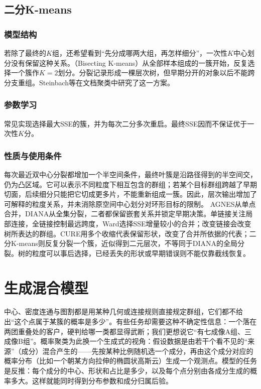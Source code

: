 \subsection{二分K-means}

\subsubsection{模型结构}

若除了最终的$K$组，还希望看到“先分成哪两大组，再怎样细分”，一次性$K$中心划分没有保留这种关系。（Bisecting K-means）从全部样本组成的一簇开始，反复选择一个簇作$K=2$划分。分裂记录形成一棵层次树，但早期分开的对象以后不能跨分支重组。Steinbach等在文档聚类中研究了这一方案。

\subsubsection{参数学习}

常见实现选择最大SSE的簇，并为每次二分多次重启。最终SSE因而不保证优于一次性$K$分。

\subsubsection{性质与使用条件}

每次最近双中心分裂都增加一个半空间条件，最终叶簇是沿路径得到的半空间交，仍为凸区域。它可以表示不同粒度下相互包含的群组；若某个目标群组跨越了早期切面，后续细分只能把它切成更多片，不能重新组成一簇。因此，层次输出增加了可解释的粒度关系，并未消除原空间中心划分对环形目标的限制。
AGNES从单点合并，DIANA从全集分裂，二者都保留嵌套关系并锁定早期决策。单链接关注局部连接，全链接控制最远跨度，Ward选择SSE增量较小的合并；改变链接会改变树所表达的群组。CURE用多个收缩代表保留形状，改变了合并所依据的代表；二分K-means则反复分裂一个簇，近似得到二元层次，不等同于DIANA的全局分裂。树的粒度可以事后选择，已经丢失的形状或早期错误则不能仅靠截线恢复。
\section{生成混合模型}
\label{sec:clustering-probabilistic}

中心、密度连通与图割都是用某种几何或连接规则直接规定群组，它们都不给出“这个点属于某簇的概率是多少”。有些任务却需要这种不确定性信息：一个落在两团重叠处的客户，硬判给哪一类都显得武断；我们更想说它“有七成像A组、三成像B组”。概率聚类为此换一个生成式的视角：假设数据是由若干个看不见的“来源”（成分）混合产生的——先按某种比例随机选一个成分，再由这个成分对应的概率分布（比如一个朝某方向拉伸的椭圆状高斯云）生成一个观测点。模型的任务是反推：每个成分的中心、形状和占比是多少，以及每个点分别由各成分生成的概率多大。这样就能同时得到分布参数和成分归属后验。

